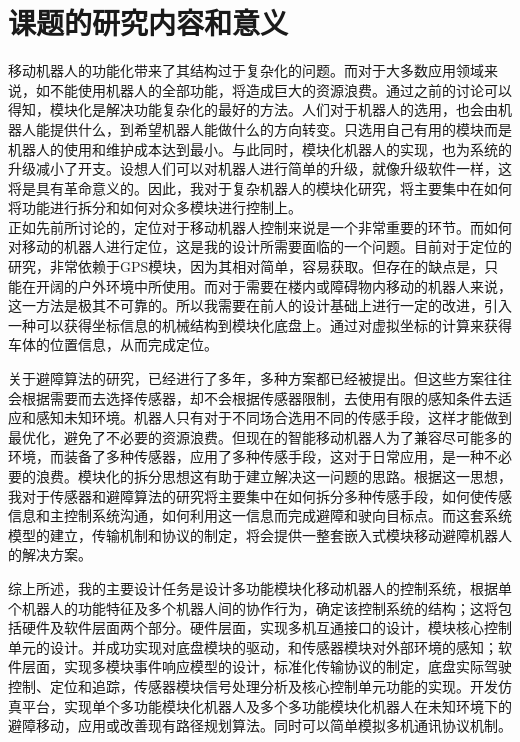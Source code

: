 \section{课题的研究内容和意义}
移动机器人的功能化带来了其结构过于复杂化的问题。而对于大多数应用领域来说，如不能使用机器人的全部功能，将造成巨大的资源浪费。通过之前的讨论可以得知，模块化是解决功能复杂化的最好的方法。人们对于机器人的选用，也会由机器人能提供什么，到希望机器人能做什么的方向转变。只选用自己有用的模块而是机器人的使用和维护成本达到最小。与此同时，模块化机器人的实现，也为系统的升级减小了开支。设想人们可以对机器人进行简单的升级，就像升级软件一样，这将是具有革命意义的。因此，我对于复杂机器人的模块化研究，将主要集中在如何将功能进行拆分和如何对众多模块进行控制上。 \\
正如先前所讨论的，定位对于移动机器人控制来说是一个非常重要的环节。而如何对移动的机器人进行定位，这是我的设计所需要面临的一个问题。目前对于定位的研究，非常依赖于GPS模块，因为其相对简单，容易获取。但存在的缺点是，只能在开阔的户外环境中所使用。而对于需要在楼内或障碍物内移动的机器人来说，这一方法是极其不可靠的。所以我需要在前人的设计基础上进行一定的改进，引入一种可以获得坐标信息的机械结构到模块化底盘上。通过对虚拟坐标的计算来获得车体的位置信息，从而完成定位。

关于避障算法的研究，已经进行了多年，多种方案都已经被提出。但这些方案往往会根据需要而去选择传感器，却不会根据传感器限制，去使用有限的感知条件去适应和感知未知环境。机器人只有对于不同场合选用不同的传感手段，这样才能做到最优化，避免了不必要的资源浪费。但现在的智能移动机器人为了兼容尽可能多的环境，而装备了多种传感器，应用了多种传感手段，这对于日常应用，是一种不必要的浪费。模块化的拆分思想这有助于建立解决这一问题的思路。根据这一思想，我对于传感器和避障算法的研究将主要集中在如何拆分多种传感手段，如何使传感信息和主控制系统沟通，如何利用这一信息而完成避障和驶向目标点。而这套系统模型的建立，传输机制和协议的制定，将会提供一整套嵌入式模块移动避障机器人的解决方案。

综上所述，我的主要设计任务是设计多功能模块化移动机器人的控制系统，根据单个机器人的功能特征及多个机器人间的协作行为，确定该控制系统的结构；这将包括硬件及软件层面两个部分。硬件层面，实现多机互通接口的设计，模块核心控制单元的设计。并成功实现对底盘模块的驱动，和传感器模块对外部环境的感知；软件层面，实现多模块事件响应模型的设计，标准化传输协议的制定，底盘实际驾驶控制、定位和追踪，传感器模块信号处理分析及核心控制单元功能的实现。开发仿真平台，实现单个多功能模块化机器人及多个多功能模块化机器人在未知环境下的避障移动，应用或改善现有路径规划算法。同时可以简单模拟多机通讯协议机制。 



